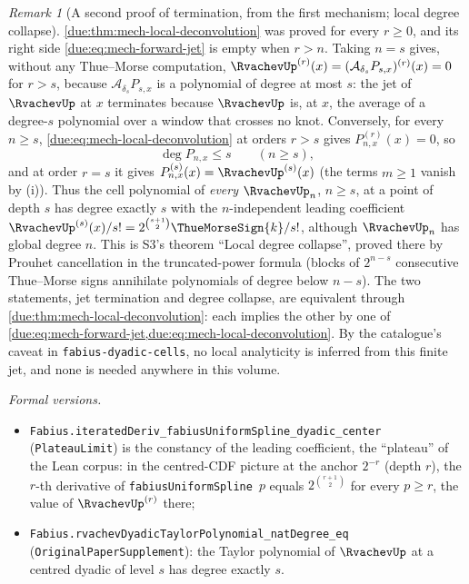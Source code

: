 \documentclass[11pt,oneside]{article}
\theoremstyle{plain}
\theoremstyle{definition}
\theoremstyle{remark}
\newtheorem{remark}[theorem]{Remark}
\newcommand{\upn}[1]{\RvachevUp_{#1}}
\begin{document}
\begin{remark}[A second proof of termination, from the first mechanism; local
degree collapse]
\label{due:rmk:mech-second-proof}
\cref{due:thm:mech-local-deconvolution} was proved for every \(r\ge0\), and
its right side \cref{due:eq:mech-forward-jet} is empty when \(r>n\).  Taking
\(n=s\) gives, without any Thue--Morse computation,
\(\RvachevUp^{(r)}(x)=(\mathcal A_{\delta_s}P_{s,x})^{(r)}(x)=0\) for
\(r>s\), because \(\mathcal A_{\delta_s}P_{s,x}\) is a polynomial of degree at
most \(s\): the jet of \(\RvachevUp\) at \(x\) terminates because
\(\RvachevUp\) is, at \(x\), the average of a degree-\(s\) polynomial over a
window that crosses no knot.  Conversely, for every \(n\ge s\),
\cref{due:eq:mech-local-deconvolution} at orders \(r>s\) gives
\(P_{n,x}^{(r)}(x)=0\), so
\begin{equation}
 \deg P_{n,x}\le s\qquad(n\ge s),
 \label{due:eq:mech-degree-collapse}
\end{equation}
and at order \(r=s\) it gives \(P_{n,x}^{(s)}(x)=\RvachevUp^{(s)}(x)\)
(the terms \(m\ge1\) vanish by (i)).  Thus the cell polynomial of
\emph{every} \(\upn{n}\), \(n\ge s\), at a point of depth \(s\) has degree
exactly \(s\) with the \(n\)-independent leading coefficient
\(\RvachevUp^{(s)}(x)/s!=2^{\binom{s+1}{2}}\ThueMorseSign{k}/s!\), although
\(\upn{n}\) has global degree \(n\).  This is S3's theorem ``Local degree
collapse'', proved there by Prouhet cancellation in the truncated-power
formula (blocks of \(2^{n-s}\) consecutive Thue--Morse signs annihilate
polynomials of degree below \(n-s\)).  The two statements, jet termination
and degree collapse, are equivalent through
\cref{due:thm:mech-local-deconvolution}: each implies the other by one of
\cref{due:eq:mech-forward-jet,due:eq:mech-local-deconvolution}.  By the catalogue's caveat in \texttt{fabius-dyadic-cells}, no local
analyticity is inferred from this finite jet, and none is needed anywhere in
this volume.

\emph{Formal versions.}
\begin{sloppypar}
\begin{itemize}
\item \texttt{Fabius.\allowbreak iteratedDeriv\_\allowbreak fabiusUniformSpline\_\allowbreak dyadic\_\allowbreak center}
(\texttt{PlateauLimit}) is the constancy of the leading coefficient, the
``plateau'' of the Lean corpus: in the centred-CDF picture at the anchor
\(2^{-r}\) (depth \(r\)), the \(r\)-th derivative of
\texttt{fabiusUniformSpline}~\(p\) equals \(2^{\binom{r+1}{2}}\) for every
\(p\ge r\), the value of \(\RvachevUp^{(r)}\) there;
\item \texttt{Fabius.\allowbreak rvachevDyadicTaylorPolynomial\_\allowbreak natDegree\_\allowbreak eq}
(\texttt{OriginalPaperSupplement}): the Taylor polynomial of \(\RvachevUp\)
at a centred dyadic of level \(s\) has degree exactly \(s\).
\end{itemize}
\end{sloppypar}
\end{remark}
\end{document}
